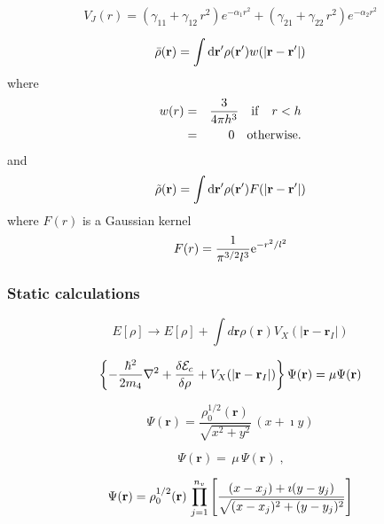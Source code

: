 \documentclass[11pt,a4paper,twoside]{article}
\begin{document}
			\begin{equation}
			V_J(r) = (\gamma_{11} +\gamma_{12} \, r^2) e^{-\alpha_1 r^2}+(\gamma_{21} +\gamma_{22} \, r^2) e^{-\alpha_2 r^2}
			\label{eq15}
			\end{equation}
			
			\begin{equation}
{\bar \rho}({\bf r}) = \int {\rm d}{\bf r'} \rho({\bf r'}) w(|{\bf r}-{\bf r'}|)
\label{eq11}
\end{equation}
%
where
%
\begin{eqnarray}
w(r) &=& \frac{3}{4 \pi h^3} \quad {\rm if} \quad r <h \nonumber \\
&=& 0 \quad {\rm otherwise.} 
\label{eq12}
\end{eqnarray} 
%
and 
%
\begin{equation}
{\tilde \rho}({\bf r}) = \int {\rm d}{\bf r'} \rho({\bf r'}) F(|{\bf r}-{\bf r'}|)
\label{eq13}
\end{equation}
%
where $F(r)$ is a Gaussian kernel
%
\begin{equation}
F(r)= \frac{1}{\pi^{3/2}l^3} {\rm e}^{-r^2/l^2}
\label{eq14}
\end{equation}

			\subsubsection{Static calculations}
				\begin{equation}
E[\rho] \rightarrow E[\rho] +  \int d {\mathbf r} \rho({\mathbf r}) V_X(|{\mathbf r} - {\mathbf r}_I|)  
\label{eq20}
\end{equation}

				\begin{equation}
\left\{-\frac{\hbar^2}{2m_4} \nabla^2 + \frac{\delta {\cal E}_c}{\delta \rho}  + V_X(|{\mathbf r} - {\mathbf r}_I|) \right\}\Psi({\mathbf r})  
= \mu \Psi({\mathbf r})
\label{eq21}
\end{equation}

			\begin{equation}
\Psi(\mathbf{r}) = \frac{\rho_0^{1/2}(\mathbf{r})}{\sqrt{x^2 + y^2}} \, (x + \imath y)
\label{eq28}
\end{equation}

\begin{equation}
[{\cal H}-\omega \hat{L}_z] \,  \Psi  (\mathbf{r})  =  \,\mu \,
\Psi (\mathbf{r}) \;,
\label{eq31}
\end{equation}

\begin{equation}
\Psi(\mathbf{r})=\rho_0^{1/2}(\mathbf{r})\, \prod _{j=1}^{n_v} \left[ {(x-x_j)+\imath (y-y_j) \over \sqrt{(x-x_j)^2+(y-y_j)^2}}  \right] 
\label{eq32}
\end{equation}
\end{document}
